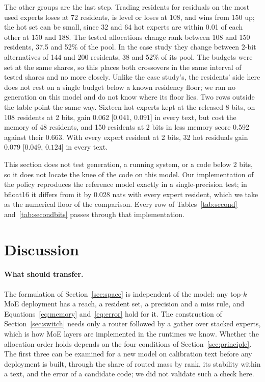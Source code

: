 \documentclass[11pt]{article}
\newcommand{\ci}[2]{[$#1$, $#2$]}
\begin{document}
The other groups are the last step. Trading residents for residuals on the most used experts
loses at 72 residents, is level or loses at 108, and wins from 150 up; the hot set can be small,
since 32 and 64 hot experts are within 0.01 of each other at 150 and 188. The tested allocations
change rank between 108 and 150 residents, 37.5 and 52\% of the pool. In the case study they
change between 2-bit alternatives of 144 and 200 residents, 38 and 52\% of its pool. The budgets
were set at the same shares, so this places both crossovers in the same interval of tested
shares and no more closely. Unlike the case study's, the residents' side here does not rest on
a single budget below a known residency floor; we ran no generation on this model and do not
know where its floor lies. Two rows outside the table point the same way. Sixteen hot experts
kept at the released 8 bits, on 108 residents at 2 bits, gain 0.062 \ci{0.041}{0.091} in every
text, but cost the memory of 48 residents, and 150 residents at 2 bits in less memory score
0.592 against their 0.663. With every expert resident at 2 bits, 32 hot residuals gain 0.079
\ci{0.049}{0.124} in every text.

This section does not test generation, a running system, or a code below 2 bits, so it does
not locate the knee of the code on this model. Our implementation of the policy reproduces the
reference model exactly in a single-precision test; in bfloat16 it differs from it by 0.028
nats with every expert resident, which we take as the numerical floor of the comparison. Every
row of Tables~\ref{tab:second} and~\ref{tab:secondbits} passes through that implementation.

\FloatBarrier
\section{Discussion}
\label{sec:discussion}

\paragraph{What should transfer.} The formulation of Section~\ref{sec:space} is independent of
the model: any top-$k$ MoE deployment has a reach, a resident set, a precision and a miss rule,
and Equations~\ref{eq:memory} and~\ref{eq:error} hold for it. The construction of
Section~\ref{sec:switch} needs only a router followed by a gather over stacked experts, which
is how MoE layers are implemented in the runtimes we know. Whether the allocation order holds depends on the four conditions of Section~\ref{sec:principle}. The first three can be examined for a new model on calibration text before any deployment is built, through the share of routed mass by rank, its stability within a text, and the error of a candidate code; we did not validate such a check here.
\end{document}
